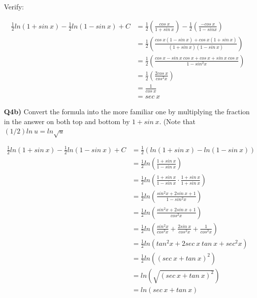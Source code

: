 \documentclass[9pt]{article}
\begin{document}
Verify:

\begin{align*}
  \frac{1}{2} ln(1 + sin \ x) - \frac{1}{2} ln(1 - sin \ x) + C &= \frac{1}{2} (\frac{cos \ x}{1 + sin \ x}) - \frac{1}{2} (\frac{- cos \ x}{1 - sin x}) \\
  &= \frac{1}{2} (\frac{cos \ x (1 - sin \ x) + cos \ x (1 + sin \ x)}{(1 + sin \ x)(1 - sin \ x)}) \\
  &= \frac{1}{2} (\frac{cos \ x - sin \ x \ cos \ x + cos \ x + sin \ x \ cos \ x}{1 - sin^2 x}) \\
  &= \frac{1}{2} (\frac{2 cos \ x}{cos^2 x}) \\
  &= \frac{1}{cos \ x} \\
  &= sec \ x
\end{align*}


\begin{tcolorbox}
  \textbf{Q4b)} Convert the formula into the more familiar one by multiplying the fraction in the answer on both top and bottom by $1 + sin \ x$. (Note that $(1 / 2) ln \ u = ln \sqrt{u}$
\end{tcolorbox}

\begin{align*}
  \frac{1}{2} ln(1 + sin \ x) - \frac{1}{2} ln(1 - sin \ x) + C &= \frac{1}{2} (ln(1 + sin \ x) - ln(1 - sin \ x)) \\
  &= \frac{1}{2} ln(\frac{1 + sin \ x}{1 - sin \ x}) \\
  &= \frac{1}{2} ln(\frac{1 + sin \ x}{1 - sin \ x} \cdot \frac{1 + sin \ x}{1 + sin \ x}) \\
  &= \frac{1}{2} ln(\frac{sin^2 x + 2 sin \ x + 1}{1 - sin^2 x}) \\
  &= \frac{1}{2} ln(\frac{sin^2 x + 2 sin \ x + 1}{cos^2 x}) \\
  &= \frac{1}{2} ln(\frac{sin^2 x}{cos^2 x} + \frac{2 sin \ x}{cos^2 x} + \frac{1}{cos^2 x}) \\
  &= \frac{1}{2} ln(tan^2 x + 2 sec \ x \ tan \ x + sec^2 x) \\
  &= \frac{1}{2} ln((sec \ x + tan \ x)^2) \\
  &= ln(\sqrt{(sec \ x + tan \ x)^2}) \\
  &= ln(sec \ x + tan \ x)
\end{align*}
\end{document}
